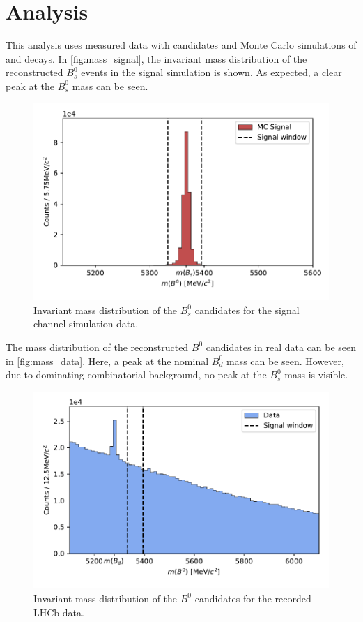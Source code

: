 \section{Analysis}
\label{sec:Analysis}
This analysis uses measured data with \printBtoPsiKs \: candidates and Monte Carlo simulations of \printBstoPsiKs \: and \printBdtoPsiKs \: decays. %
In \autoref{fig:mass_signal}, the invariant mass distribution of the reconstructed $B^0_s$ events in the signal simulation is shown.
As expected, a clear peak at the $B^0_s$ mass can be seen.
\begin{figure}
  \centering
  \includegraphics[width = .8\textwidth]{"content/plots/mass_signal.pdf"}
  \caption{Invariant mass distribution of the $B^0_s$ candidates for the signal channel simulation data.}
  \label{fig:mass_signal}
\end{figure}
The mass distribution of the reconstructed $B^0$ candidates in real data can be seen in \autoref{fig:mass_data}. Here, a peak at the nominal $B^0_d$ mass can be seen. However,
due to dominating combinatorial background, no peak at the $B^0_s$ mass is visible.
\begin{figure}
  \centering
  \includegraphics[width = .8\textwidth]{"content/plots/mass_data.pdf"}
  \caption{Invariant mass distribution of the $B^0$ candidates for the recorded LHCb data.}
  \label{fig:mass_data}
\end{figure}
